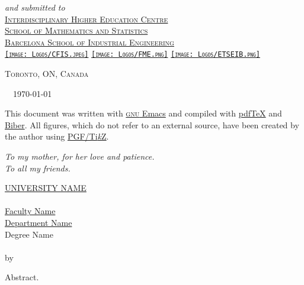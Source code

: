 \begin{titlepage}
  \large
  \textsl{and submitted to}\Large\\
  \scshape
  \href{https://cfis.upc.edu/en}{Interdisciplinary Higher Education Centre}\\
  \href{https://fme.upc.edu/en}{School of Mathematics and Statistics}\\
  \href{https://etseib.upc.edu/en}{Barcelona School of Industrial Engineering}\\[2ex]
  \href{https://cfis.upc.edu/en}{\texttt{[image: Logos/CFIS.jpeg]}}
  \hspace{2em}
  \href{https://fme.upc.edu/en}{\texttt{[image: Logos/FME.png]}}
  \hspace{2em}
  \href{https://etseib.upc.edu/en}{\texttt{[image: Logos/ETSEIB.png]}}\\

  \vfill

  \large\scshape
  Toronto, ON, Canada \hfill \@date

  \makeatother
\end{titlepage}


\thispagestyle{empty}
\small
\null\vfill

\noindent\makeatletter\@author\makeatother\ \textcopyright\ \today\\
\makeatletter\href{https://recomprehension.com/}{\texttt{\@title}}\makeatother\bigskip

\noindent This document was written with
\href{https://www.gnu.org/software/emacs/}{\textsc{gnu} Emacs} and compiled
with \href{http://tug.org/applications/pdftex/}{pdf\TeX{}} and
\href{http://biblatex-biber.sourceforge.net/}{Biber}. All figures, which do not
refer to an external source, have been created by the author using
\href{https://www.ctan.org/pkg/pgf}{PGF/Ti\emph{k}Z}.

\doclicenseThis
\normalsize


\cleardoublepage
\thispagestyle{empty}
\begin{flushright}
  \itshape
  To my mother, for her love and patience. \\
  To all my friends.
\end{flushright}


\cleardoublepage
\thispagestyle{plain}
\null\vfill
\begin{center}
  \makeatletter
  \MakeUppercase{\href{https://href.com}{University Name}} \\
  \vspace{20pt}
  {\huge \textit{\abstractname}} \\
  \bigskip
  \href{https://href.com}{Faculty Name} \\
  \href{https://href.com}{Department Name} \\
  \bigskip
  Degree Name \\
  \bigskip
  \textbf{\@title} \\
  \medskip
  by \@author \\
  \bigskip
  \makeatother
\end{center}
Abstract.
\vfill\null


